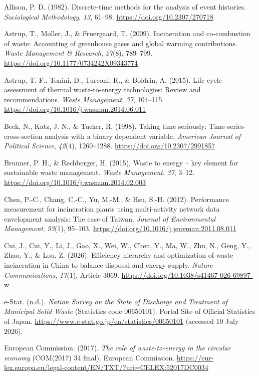\documentclass[12pt,letterpaper]{article}
\begin{document}
Allison, P. D. (1982). Discrete-time methods for the analysis of event
histories. \textit{Sociological Methodology}, \textit{13}, 61--98.
\url{https://doi.org/10.2307/270718}

Astrup, T., M\o ller, J., \& Fruergaard, T. (2009). Incineration and
co-combustion of waste: Accounting of greenhouse gases and global warming
contributions. \textit{Waste Management \& Research}, \textit{27}(8), 789--799.
\url{https://doi.org/10.1177/0734242X09343774}

Astrup, T. F., Tonini, D., Turconi, R., \& Boldrin, A. (2015). Life cycle
assessment of thermal waste-to-energy technologies: Review and recommendations.
\textit{Waste Management}, \textit{37}, 104--115.
\url{https://doi.org/10.1016/j.wasman.2014.06.011}

Beck, N., Katz, J. N., \& Tucker, R. (1998). Taking time seriously:
Time-series-cross-section analysis with a binary dependent variable.
\textit{American Journal of Political Science}, \textit{42}(4), 1260--1288.
\url{https://doi.org/10.2307/2991857}

Brunner, P. H., \& Rechberger, H. (2015). Waste to energy -- key element for
sustainable waste management. \textit{Waste Management}, \textit{37}, 3--12.
\url{https://doi.org/10.1016/j.wasman.2014.02.003}

Chen, P.-C., Chang, C.-C., Yu, M.-M., \& Hsu, S.-H. (2012). Performance
measurement for incineration plants using multi-activity network data
envelopment analysis: The case of Taiwan. \textit{Journal of Environmental
Management}, \textit{93}(1), 95--103.
\url{https://doi.org/10.1016/j.jenvman.2011.08.011}

Cui, J., Cui, Y., Li, J., Gao, X., Wei, W., Chen, Y., Ma, W., Zhu, N., Geng,
Y., Zhao, Y., \& Lou, Z. (2026). Efficiency hierarchy and optimization of
waste incineration in China to balance disposal and energy supply.
\textit{Nature Communications}, \textit{17}(1), Article 3069.
\url{https://doi.org/10.1038/s41467-026-69897-w}

e-Stat. (n.d.). \textit{Nation Survey on the State of Discharge and Treatment
of Municipal Solid Waste} (Statistics code 00650101). Portal Site of Official
Statistics of Japan. \url{https://www.e-stat.go.jp/en/statistics/00650101}
(accessed 10 July 2026).

European Commission. (2017). \textit{The role of waste-to-energy in the
circular economy} (COM(2017) 34 final). European Commission.
\url{https://eur-lex.europa.eu/legal-content/EN/TXT/?uri=CELEX:52017DC0034}
\end{document}
